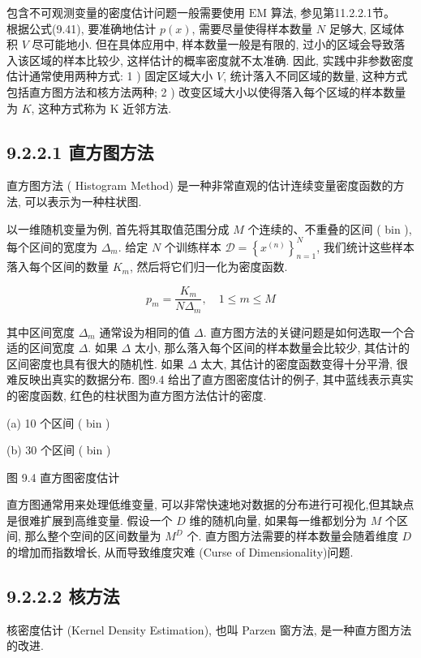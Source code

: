 \documentclass[10pt]{article}
\begin{document}
包含不可观测变量的密度估计问题一般需要使用 $\mathrm{EM}$ 算法, 参见第11.2.2.1节。\\
根据公式(9.41), 要准确地估计 $p(x)$, 需要尽量使得样本数量 $N$ 足够大, 区域体积 $V$ 尽可能地小. 但在具体应用中, 样本数量一般是有限的, 过小的区域会导致落入该区域的样本比较少, 这样估计的概率密度就不太准确. 因此, 实践中非参数密度估计通常使用两种方式: 1 ) 固定区域大小 $V$, 统计落入不同区域的数量, 这种方式包括直方图方法和核方法两种; 2 ) 改变区域大小以使得落入每个区域的样本数量为 $K$, 这种方式称为 $\mathrm{K}$ 近邻方法.

\subsection*{9.2.2.1 直方图方法}
直方图方法 ( Histogram Method) 是一种非常直观的估计连续变量密度函数的方法, 可以表示为一种柱状图.

以一维随机变量为例, 首先将其取值范围分成 $M$ 个连续的、不重叠的区间 ( bin ), 每个区间的宽度为 $\Delta_{m}$. 给定 $N$ 个训练样本 $\mathcal{D}=\left\{x^{(n)}\right\}_{n=1}^{N}$, 我们统计这些样本落入每个区间的数量 $K_{m}$, 然后将它们归一化为密度函数.


\begin{equation*}
p_{m}=\frac{K_{m}}{N \Delta_{m}}, \quad 1 \leq m \leq M \tag{9.42}
\end{equation*}


其中区间宽度 $\Delta_{m}$ 通常设为相同的值 $\Delta$. 直方图方法的关键问题是如何选取一个合适的区间宽度 $\Delta$. 如果 $\Delta$ 太小, 那么落入每个区间的样本数量会比较少, 其估计的区间密度也具有很大的随机性. 如果 $\Delta$ 太大, 其估计的密度函数变得十分平滑, 很难反映出真实的数据分布. 图9.4 给出了直方图密度估计的例子, 其中蓝线表示真实的密度函数, 红色的柱状图为直方图方法估计的密度.



(a) 10 个区间 ( bin )



(b) 30 个区间 ( bin )

图 9.4 直方图密度估计

直方图通常用来处理低维变量, 可以非常快速地对数据的分布进行可视化,但其缺点是很难扩展到高维变量. 假设一个 $D$ 维的随机向量, 如果每一维都划分为 $M$ 个区间, 那么整个空间的区间数量为 $M^{D}$ 个. 直方图方法需要的样本数量会随着维度 $D$ 的增加而指数增长, 从而导致维度灾难 (Curse of Dimensionality)问题.

\subsection*{9.2.2.2 核方法}
核密度估计 (Kernel Density Estimation), 也叫 Parzen 窗方法, 是一种直方图方法的改进.
\end{document}
